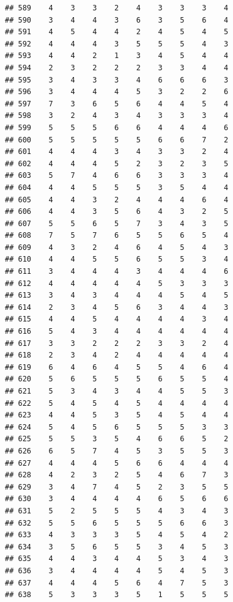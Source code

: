 \documentclass[
]{article}
\begin{document}
\begin{verbatim}
## 589    4    3    3    2    4    3    3    3    4
## 590    3    4    4    3    6    3    5    6    4
## 591    4    5    4    4    2    4    5    4    5
## 592    4    4    4    3    5    5    5    4    3
## 593    4    4    2    1    3    4    5    4    4
## 594    2    3    2    2    2    3    3    4    4
## 595    3    4    3    3    4    6    6    6    3
## 596    3    4    4    4    5    3    2    2    6
## 597    7    3    6    5    6    4    4    5    4
## 598    3    2    4    3    4    3    3    3    4
## 599    5    5    5    6    6    4    4    4    6
## 600    5    5    5    5    5    6    6    7    2
## 601    4    4    4    3    4    3    3    2    4
## 602    4    4    4    5    2    3    2    3    5
## 603    5    7    4    6    6    3    3    3    4
## 604    4    4    5    5    5    3    5    4    4
## 605    4    4    3    2    4    4    4    6    4
## 606    4    4    3    5    6    4    3    2    5
## 607    5    5    6    5    7    3    4    3    5
## 608    7    5    7    6    5    5    6    5    4
## 609    4    3    2    4    6    4    5    4    3
## 610    4    4    5    5    6    5    5    3    4
## 611    3    4    4    4    3    4    4    4    6
## 612    4    4    4    4    4    5    3    3    3
## 613    3    4    3    4    4    4    5    4    5
## 614    2    3    4    5    6    3    4    4    3
## 615    4    4    5    4    4    4    4    3    4
## 616    5    4    3    4    4    4    4    4    4
## 617    3    3    2    2    2    3    3    2    4
## 618    2    3    4    2    4    4    4    4    4
## 619    6    4    6    4    5    5    4    6    4
## 620    5    6    5    5    5    6    5    5    4
## 621    5    3    4    3    4    4    5    5    3
## 622    5    4    5    4    5    4    4    4    4
## 623    4    4    5    3    5    4    5    4    4
## 624    5    4    5    6    5    5    5    3    3
## 625    5    5    3    5    4    6    6    5    2
## 626    6    5    7    4    5    3    5    5    3
## 627    4    4    4    5    6    6    4    4    4
## 628    4    2    3    2    5    4    6    7    3
## 629    3    4    7    4    5    2    3    5    5
## 630    3    4    4    4    4    6    5    6    6
## 631    5    2    5    5    5    4    3    4    3
## 632    5    5    6    5    5    5    6    6    3
## 633    4    3    3    3    5    4    5    4    2
## 634    3    5    6    5    5    3    4    5    3
## 635    4    4    3    4    4    5    3    4    3
## 636    3    4    4    4    4    5    4    5    3
## 637    4    4    4    5    6    4    7    5    3
## 638    5    3    3    3    5    1    5    5    5

\end{verbatim}
\end{document}
